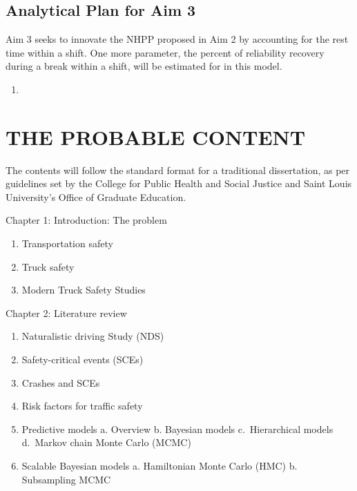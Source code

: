 \documentclass[12pt]{book}
\numberwithin{equation}{chapter}
\providecommand{\tightlist}{%
  \setlength{\itemsep}{0pt}\setlength{\parskip}{0pt}}
\begin{document}
\hypertarget{analytical-plan-for-aim-3}{%
\section{Analytical Plan for Aim 3}\label{analytical-plan-for-aim-3}}

Aim 3 seeks to innovate the NHPP proposed in Aim 2 by accounting for the rest time within a shift. One more parameter, the percent of reliability recovery during a break within a shift, will be estimated for in this model.

\begin{enumerate}
\def\labelenumi{\arabic{enumi}.}
\item
\end{enumerate}

\hypertarget{the-probable-content}{%
\chapter{THE PROBABLE CONTENT}\label{the-probable-content}}

The contents will follow the standard format for a traditional dissertation, as per guidelines set by the College for Public Health and Social Justice and Saint Louis University's Office of Graduate Education.

Chapter 1: Introduction: The problem

\begin{enumerate}
\def\labelenumi{\arabic{enumi}.}
\tightlist
\item
  Transportation safety
\item
  Truck safety
\item
  Modern Truck Safety Studies
\end{enumerate}

Chapter 2: Literature review

\begin{enumerate}
\def\labelenumi{\arabic{enumi}.}
\tightlist
\item
  Naturalistic driving Study (NDS)
\item
  Safety-critical events (SCEs)
\item
  Crashes and SCEs
\item
  Risk factors for traffic safety
\item
  Predictive models
  a. Overview
  b. Bayesian models
  c.~Hierarchical models
  d.~Markov chain Monte Carlo (MCMC)
\item
  Scalable Bayesian models
  a. Hamiltonian Monte Carlo (HMC)
  b. Subsampling MCMC
\end{enumerate}
\end{document}
